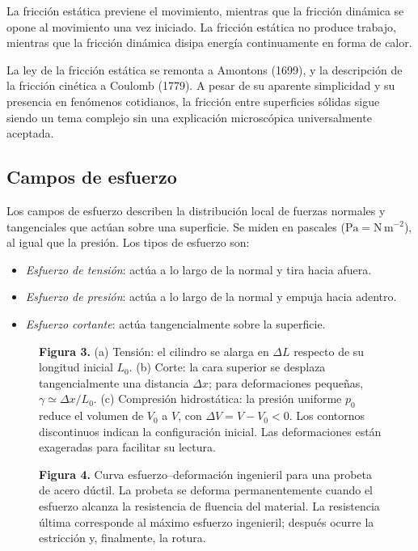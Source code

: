 La fricción estática previene el movimiento, mientras que la fricción dinámica se opone al movimiento una vez iniciado. La fricción estática no produce trabajo, mientras que la fricción dinámica disipa energía continuamente en forma de calor.

La ley de la fricción estática se remonta a Amontons (1699), y la descripción de la fricción cinética a Coulomb (1779). A pesar de su aparente simplicidad y su presencia en fenómenos cotidianos, la fricción entre superficies sólidas sigue siendo un tema complejo sin una explicación microscópica universalmente aceptada.

\subsection{Campos de esfuerzo}

Los campos de esfuerzo describen la distribución local de fuerzas normales y tangenciales que actúan sobre una superficie. Se miden en pascales ($\mathrm{Pa} = \mathrm{N\,m^{-2}}$), al igual que la presión. Los tipos de esfuerzo son:

\begin{itemize}
\item \emph{Esfuerzo de tensión}: actúa a lo largo de la normal y tira hacia afuera.
\item \emph{Esfuerzo de presión}: actúa a lo largo de la normal y empuja hacia adentro.
\item \emph{Esfuerzo cortante}: actúa tangencialmente sobre la superficie.
\end{itemize}

\begin{figure}[H]
\centering

\par\medskip
\textbf{Figura 3.} (a) Tensión: el cilindro se alarga en $\Delta L$ respecto de su longitud inicial $L_0$. (b) Corte: la cara superior se desplaza tangencialmente una distancia $\Delta x$; para deformaciones pequeñas, $\gamma\simeq\Delta x/L_0$. (c) Compresión hidrostática: la presión uniforme $p_0$ reduce el volumen de $V_0$ a $V$, con $\Delta V=V-V_0<0$. Los contornos discontinuos indican la configuración inicial. Las deformaciones están exageradas para facilitar su lectura.
\end{figure}

\begin{figure}[H]
\centering

\par\medskip
\textbf{Figura 4.} Curva esfuerzo–deformación ingenieril para una probeta de acero dúctil. La probeta se deforma permanentemente cuando el esfuerzo alcanza la resistencia de fluencia del material. La resistencia última corresponde al máximo esfuerzo ingenieril; después ocurre la estricción y, finalmente, la rotura.
\end{figure}

